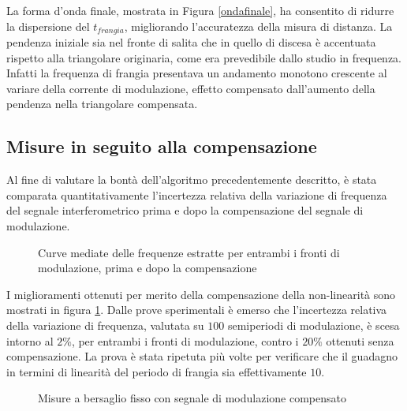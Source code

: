 La forma d'onda finale, mostrata in Figura \ref{ondafinale}, ha consentito di ridurre la dispersione del $t_{frangia}$, migliorando l'accuratezza della misura di distanza. La pendenza iniziale sia nel fronte di salita che in quello di discesa è accentuata rispetto alla triangolare originaria, come era prevedibile dallo studio in frequenza. Infatti la frequenza di frangia presentava un andamento monotono crescente al variare della corrente di modulazione, effetto compensato dall'aumento della pendenza nella triangolare compensata.

\subsection{Misure in seguito alla compensazione}
Al fine di valutare la bontà dell'algoritmo precedentemente descritto, è stata comparata quantitativamente l'incertezza relativa della variazione di frequenza del segnale interferometrico prima e dopo la compensazione del segnale di modulazione.

\begin{figure}
\centering
{}
\hspace{5mm}
\caption{Curve mediate delle frequenze estratte per entrambi i fronti di modulazione, prima e dopo la compensazione}\label{primadopocomp}
\end{figure}

I miglioramenti ottenuti per merito della compensazione della non-linearità sono mostrati in figura \ref{primadopocomp}. Dalle prove sperimentali è emerso che l'incertezza relativa della variazione di frequenza, valutata su $100$ semiperiodi di modulazione, è scesa intorno al $2\%$, per entrambi i fronti di modulazione, contro i $20\%$ ottenuti senza compensazione. La prova è stata ripetuta più volte per verificare che il guadagno in termini di linearità del periodo di frangia sia effettivamente $10$.
\begin{figure}
\centering
{}
\hspace{5mm}
\caption{Misure a bersaglio fisso con segnale di modulazione compensato}\label{misfisso3}
\end{figure}

